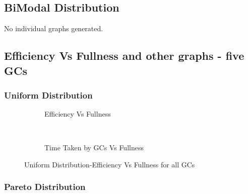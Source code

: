 \subsection{BiModal Distribution}
	No individual graphs generated.


\subsection{Efficiency Vs Fullness and other graphs - five GCs}

\subsubsection{Uniform Distribution}

\begin{figure}[H]
        \centering
        \begin{subfigure}[b]{0.4\textwidth}
                \centering
                \caption{Efficiency Vs Fullness} \label{Uniform-AllGC-EffVsFull}
        \end{subfigure}
        ~~~ %
        \begin{subfigure}[b]{0.4\textwidth}
                \centering
                \caption{Time Taken by GCs Vs Fullness} \label{Uniform-GCTimeVsFull}
        \end{subfigure}
        \caption{Uniform Distribution-Efficiency Vs Fullness for all GCs}
\end{figure}

\subsubsection{Pareto Distribution}

